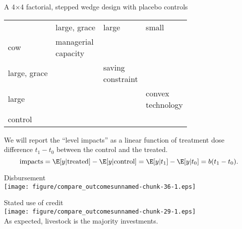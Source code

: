 \begin{frame}{}
A 4$\times$4 factorial, stepped wedge design with placebo controls\\

\vspace{2ex}
\pause
\hfil\begin{tabular}{>{\footnotesize\hfill}p{2cm}<{}
>{\footnotesize\hfil}p{2cm}<{}
>{\footnotesize\hfil}p{2cm}<{}
>{\footnotesize\hfil}p{2cm}<{}}
					& \cellcolor{paleblue}large, grace 			& \cellcolor{paleblue}large & \cellcolor{paleblue}small \\\cellcolor{paleblue}
cow 				& \mpage{2cm}{\hfil managerial\\\hfil capacity} &\cellcolor{gray50} &\cellcolor{gray50}\\\cellcolor{paleblue}
large, grace &\cellcolor{gray50} 	&  \mpage{2cm}{\hfil saving\\\hfil constraint} & \cellcolor{gray50}\\\cellcolor{paleblue}
large 			&\cellcolor{gray50} 	&\cellcolor{gray50}& \mpage{2cm}{\hfil convex\\\hfil technology}\\\cellcolor{pink}
control & \multicolumn{3}{c}{\cellcolor{green}level \hspace{1em} impacts}
\end{tabular}

\pause
\vspace{2ex}
We will report the ``level impacts'' as a linear function of treatment dose difference $t_{1}-t_{0}$ between the control and the treated. 
\[
\mbox{impacts}=\E[y|\mbox{treated}]-\E[y|\mbox{control}]=\E[y|t_{1}]-\E[y|t_{0}]=b(t_{1}-t_{0}).
\]
\end{frame}

\begin{frame}{}

\vspace{-2ex}
\begin{adjustbox}{max size={1.0\textwidth}{1.2\textheight}}
\hspace{-1cm}
\end{adjustbox}
\end{frame}


\begin{frame}{}
Disbursement\\
\hfil\texttt{[image: figure/compare\_outcomesunnamed-chunk-36-1.eps]}
\end{frame}

\begin{frame}{}
Stated use of credit\\
\hfil\texttt{[image: figure/compare\_outcomesunnamed-chunk-29-1.eps]} \\
\pause
As expected, livestock is the majority investments.
\end{frame}


